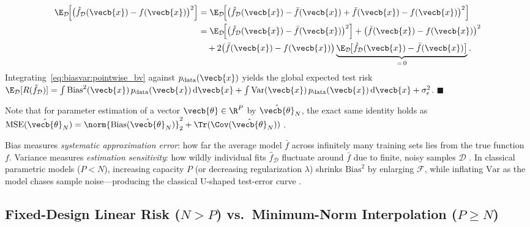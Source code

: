 \documentclass[../../../../master.tex]{subfiles}
\begin{document}
\begin{coremath}
\begin{align*}
  \E_{\mathcal{D}}\!\Big[\big(\hat{f}_{\mathcal{D}}(\vecb{x}) - f(\vecb{x})\big)^2\Big]
  &= \E_{\mathcal{D}}\!\Big[\big(\hat{f}_{\mathcal{D}}(\vecb{x}) - \bar{f}(\vecb{x}) + \bar{f}(\vecb{x}) - f(\vecb{x})\big)^2\Big] \\
  &= \E_{\mathcal{D}}\!\Big[\big(\hat{f}_{\mathcal{D}}(\vecb{x}) - \bar{f}(\vecb{x})\big)^2\Big]
   + \big(\bar{f}(\vecb{x}) - f(\vecb{x})\big)^2 \\
  &\quad + 2\big(\bar{f}(\vecb{x}) - f(\vecb{x})\big)\underbrace{\E_{\mathcal{D}}\!\big[\hat{f}_{\mathcal{D}}(\vecb{x}) - \bar{f}(\vecb{x})\big]}_{=\,0}.
\end{align*}
Integrating~\eqref{eq:biasvar:pointwise_bv} against $p_{\mathrm{data}}(\vecb{x})$ yields the global expected test risk $\E_{\mathcal{D}}[R(\hat{f}_{\mathcal{D}})] = \int \mathrm{Bias}^2(\vecb{x})\,p_{\mathrm{data}}(\vecb{x})\,\mathrm{d}\vecb{x} + \int \mathrm{Var}(\vecb{x})\,p_{\mathrm{data}}(\vecb{x})\,\mathrm{d}\vecb{x} + \sigma_\epsilon^2$. \hfill $\blacksquare$
\end{coremath}

Note that for parameter estimation of a vector $\vecb{\theta} \in \R^P$ by $\hat{\vecb{\theta}}_N$, the exact same identity holds as $\mathrm{MSE}(\hat{\vecb{\theta}}_N) = \norm{\mathrm{Bias}(\hat{\vecb{\theta}}_N)}_2^2 + \Tr(\Cov(\hat{\vecb{\theta}}_N))$ .

\begin{intuition}
\label{int:biasvar:dartboard}
Bias measures \emph{systematic approximation error}: how far the average model $\bar{f}$ across infinitely many training sets lies from the true function $f$. Variance measures \emph{estimation sensitivity}: how wildly individual fits $\hat{f}_{\mathcal{D}}$ fluctuate around $\bar{f}$ due to finite, noisy samples $\mathcal{D}$ . In classical parametric models ($P < N$), increasing capacity $P$ (or decreasing regularization $\lambda$) shrinks $\mathrm{Bias}^2$ by enlarging $\mathcal{F}$, while inflating $\mathrm{Var}$ as the model chases sample noise---producing the classical U-shaped test-error curve .
\end{intuition}

\subsection{Fixed-Design Linear Risk ($N > P$) vs.\ Minimum-Norm Interpolation ($P \ge N$)}
\end{document}
